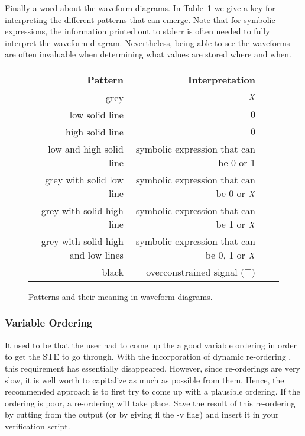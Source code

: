 Finally a word about the waveform diagrams.
In Table~\ref{wavformtable} we give a key for interpreting the
different patterns%
%
{} that can emerge.
Note that for symbolic expressions, the information printed out
to stderr is often needed to fully interpret%
%
{} the waveform diagram.
Nevertheless, being able to see the waveforms are often invaluable
when determining what values are stored where and when.

\begin{figure}[hbtp]
\begin{center}
\begin{tabular}{|r|r|c|l|} \hline
Pattern & Interpretation \\ \hline
grey & $\mbox{\em X}$ \\ \hline
low solid line & $0$ \\ \hline
high solid line & $0$ \\ \hline
low and high solid line & symbolic expression that can be 0 or 1 \\ \hline
grey with solid low line & symbolic expression that can be 0 or $\mbox{\em X}$ \\ \hline
grey with solid high line & symbolic expression that can be 1 or $\mbox{\em X}$ \\ \hline
grey with solid high and low lines & symbolic expression that can be 0, 1 or $\mbox{\em X}$ \\ \hline
black & overconstrained signal ($\top$) \\ \hline
\end{tabular}
\end{center}
\caption{Patterns and their meaning in waveform diagrams.}
\label{wavformtable}
\end{figure}

\subsubsection{Variable Ordering}
\label{OBDDordering}

It used to be that the user had to come up the a
good variable ordering in order to get the STE to go through.
With the incorporation of dynamic re-ordering%
%
{}, this requirement
has essentially disappeared.
However, since re-orderings are very slow, it is well worth
to capitalize as much as possible from them.
Hence, the recommended approach is to first try to come up with
a plausible ordering.
If the ordering is poor, a re-ordering will take place.
Save the result of this re-ordering by cutting from the output
(or by giving fl the -v flag) and insert it in your verification
script.

